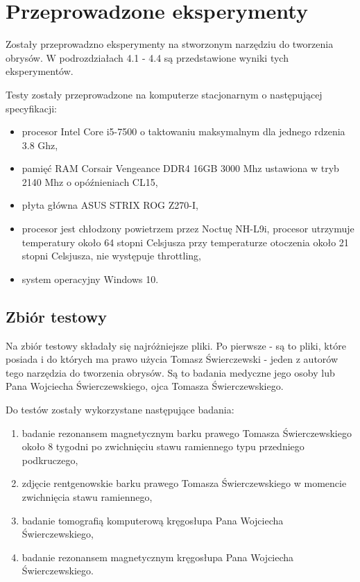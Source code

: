 \documentclass[a4paper,11pt,twoside,openright]{report}
\newcommand\blankpage{%
    \null
    \thispagestyle{empty}%
    \newpage}
\theoremstyle{definition}
\begin{document}
\afterpage{\blankpage}

\chapter {Przeprowadzone eksperymenty}

Zostały przeprowadzno eksperymenty na stworzonym narzędziu do tworzenia obrysów. W podrozdziałach 4.1 - 4.4 są przedstawione wyniki tych eksperymentów.

Testy zostały przeprowadzone na komputerze stacjonarnym o następującej specyfikacji:
\begin{itemize}[noitemsep]
\item procesor Intel Core i5-7500 o taktowaniu maksymalnym dla jednego rdzenia 3.8 Ghz,
\item pamięć RAM Corsair Vengeance DDR4 16GB 3000 Mhz ustawiona w tryb 2140 Mhz o opóźnieniach CL15,
\item płyta główna ASUS STRIX ROG Z270-I,
\item procesor jest chłodzony powietrzem przez Noctuę NH-L9i, procesor utrzymuje temperatury około 64 stopni Celsjusza przy temperaturze otoczenia około 21 stopni Celsjusza, nie występuje throttling,
\item system operacyjny Windows 10.
\end{itemize}

\section {Zbiór testowy}

Na zbiór testowy składały się najróżniejsze pliki. Po pierwsze - są to pliki, które posiada i do których ma prawo użycia Tomasz Świerczewski - jeden z autorów tego narzędzia do tworzenia obrysów. Są to badania medyczne jego osoby lub Pana Wojciecha Świerczewskiego, ojca Tomasza Świerczewskiego.

Do testów zostały wykorzystane następujące badania:
\begin{enumerate}[noitemsep]
\item badanie rezonansem magnetycznym barku prawego Tomasza Świerczewskiego około 8 tygodni po zwichnięciu stawu ramiennego typu przedniego podkruczego,
\item zdjęcie rentgenowskie barku prawego Tomasza Świerczewskiego w momencie zwichnięcia stawu ramiennego,
\item badanie tomografią komputerową kręgosłupa Pana Wojciecha Świerczewskiego,
\item badanie rezonansem magnetycznym kręgosłupa Pana Wojciecha Świerczewskiego.
\end{enumerate}
\end{document}
